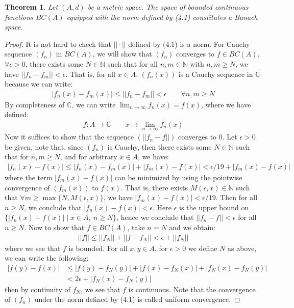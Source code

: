 \documentclass[11pt]{book}
\theoremstyle{break}
\theoremstyle{break}
\newtheorem{thm}{Theorem}[section]
\newcommand{\N}{\mathbb{N}}
\newcommand{\C}{\mathbb{C}}
\begin{document}
\begin{thm}
Let $(A,d)$ be a metric space. The space of bounded continuous functions $BC(A)$ equipped with the norm defined by (4.1) constitutes a Banach space.
\end{thm}
\begin{proof}
It is not hard to check that $||\cdot ||$ defined by (4.1) is a norm. For Cauchy sequence $(f_n)$ in $BC(A)$, we will show that $(f_n)$ converges to $f \in BC(A)$. $\forall \epsilon>0$, there exists some $N \in \N$ such that for all $n,m \in \N$ with $n,m\geq N$, we have $||f_n - f_m|| < \epsilon$. That is, for all $x \in A$, $(f_n(x))$ is a Cauchy sequence in $\C$ because we can write:
\begin{align*}
|f_n(x)- f_m(x) | \leq ||f_n - f_m|| < \epsilon \qquad \forall	 n,m \geq N
\end{align*}
By completeness of $\C$, we can write $\lim_{n\to \infty}f_n(x) = f(x)$, where we have defined:
\begin{align*}
f:A \to \C \qquad x\mapsto \lim_{n\to \infty}f_n(x)
\end{align*}
Now it suffices to show that the sequence $(||f_n - f||)$ converges to $0$. Let $\epsilon>0$ be given, note that, since $(f_n)$ is Cauchy, then there exists some $N \in \N$ such that for $n,m \geq N$, and for arbitrary $x \in A$, we have:
\begin{align*}
|f_n(x) -f(x) | \leq |f_n(x) - f_m(x) | + |f_m(x) - f(x)|< \epsilon/19 + |f_m(x) - f(x)|
\end{align*}
where the term $|f_m(x) - f(x)|$ can be minimized by using the pointwise convergence of $(f_m(x))$ to $f(x)$. That is, there exists $M(\epsilon, x) \in \N$ such that $\forall m\geq \max\{ N, M(\epsilon, x)\}$, we have  $|f_m(x) -f(x) |< \epsilon/19$. Then for all $n \geq N$, we conclude that $|f_n(x) - f(x) | < \epsilon$. Here $\epsilon$ is the upper bound on $\{|f_n(x) - f(x)| \mid x \in A,\ n\geq N\}$, hence we conclude that $||f_n - f|| <\epsilon$ for all $n \geq N$. Now to show that $f \in BC(A)$, take $n = N$ and we obtain:
\begin{align*}
||f|| \leq ||f_N|| + ||f -f_N|| < \epsilon + ||f_N||
\end{align*}
where we see that $f$ is bounded. For all $x,y \in A$, for $\epsilon>0$ we define $N$ as above, we can write the following:
\begin{align*}
|f(y) - f(x) | &\leq |f(y) - f_N(y)| + |f(x) - f_N(x)| + |f_N(x) - f_N(y)| \\
&< 2\epsilon + |f_N(x) - f_N(y)|
\end{align*}
then by continuity of $f_N$, we see that $f$ is continuous. Note that the convergence of $(f_n)$ under the norm defined by (4.1) is called uniform convergence. 
\end{proof}
\end{document}
